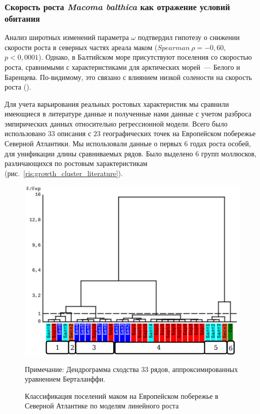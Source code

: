 {\subsubsection*{Скорость роста {\it Macoma balthica} как отражение условий обитания}
Анализ широтных изменений параметра $\omega$ подтвердил гипотезу о снижении скорости роста в северных частях ареала маком ($Spearman\ \rho = -0,60$, $p < 0,0001$).
Однако, в Балтийском море присутствуют поселения со скоростью роста, сравнимыми с характеристиками для арктических морей~--- Белого и Баренцева. 
По-видимому, это связано с влиянием низкой солености на скорость роста (\cite{Segerstrale_1960, Kube_et_al_1996}).

Для учета варьирования реальных ростовых характеристик мы сравнили имеющиеся в литературе данные и полученные нами данные с учетом разброса эмпирических данных относительно регрессионной модели.
Всего было использовано $33$ описания с $23$ географических точек на Европейском побережье Северной Атлантики.
Мы использовали данные о первых $6$ годах роста особей, для унификации длины сравниваемых рядов.
Было выделено $6$ групп моллюсков, различающихся по ростовым характеристикам (рис.~\ref{ris:growth_cluster_literature}).
	\begin{figure}[ht]
	\begin{center}	
		\includegraphics[height=0.4\textheight]{../Growth_sravnenie/Europe_clusters_usrednenie.pdf}
	\end{center}
		\caption{Классификация поселений маком на Европейском побережье в Северной Атлантике по моделям линейного роста}
	\footnotesize{Примечание: Дендрограмма сходства 33 рядов, аппроксимированных уравнением Берталанффи. 
}
\end{figure}}

